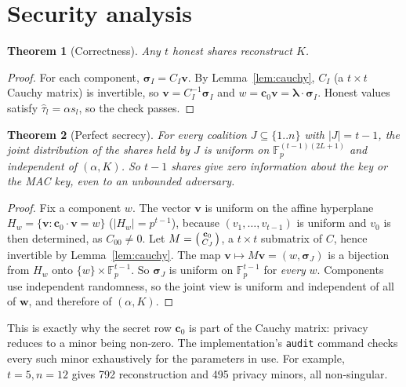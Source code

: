 \documentclass[11pt]{article}
\newtheorem{theorem}{Theorem}
\theoremstyle{remark}
\newcommand{\F}{\mathbb{F}_p}
\newcommand{\vect}[1]{\mathbf{#1}}
\begin{document}
\section{Security analysis}

\begin{theorem}[Correctness]
Any $t$ honest shares reconstruct $K$.
\end{theorem}
\begin{proof}
For each component, $\boldsymbol\sigma_I = C_I\vect v$. By Lemma~\ref{lem:cauchy},
$C_I$ (a $t\times t$ Cauchy matrix) is invertible, so
$\vect v = C_I^{-1}\boldsymbol\sigma_I$ and
$w=\vect c_0\vect v=\boldsymbol\lambda\cdot\boldsymbol\sigma_I$.
Honest values satisfy $\hat\tau_l=\alpha s_l$, so the check passes.
\end{proof}

\begin{theorem}[Perfect secrecy]\label{thm:privacy}
For every coalition $J\subseteq\{1..n\}$ with $|J|=t-1$, the joint distribution of
the shares held by $J$ is uniform on $\F^{(t-1)(2L+1)}$ and independent of
$(\alpha, K)$. So $t-1$ shares give \emph{zero} information about the key or the
MAC key, even to an unbounded adversary.
\end{theorem}
\begin{proof}
Fix a component $w$. The vector $\vect v$ is uniform on the affine hyperplane
$H_w = \{\vect v : \vect c_0\cdot\vect v = w\}$ ($|H_w| = p^{t-1}$), because
$(v_1,\dots,v_{t-1})$ is uniform and $v_0$ is then determined, as $C_{00}\neq 0$.
Let $M=\begin{psmallmatrix}\vect c_0\\ C_J\end{psmallmatrix}$, a $t\times t$
submatrix of $C$, hence invertible by Lemma~\ref{lem:cauchy}. The map
$\vect v\mapsto M\vect v = (w,\boldsymbol\sigma_J)$ is a bijection from $H_w$ onto
$\{w\}\times\F^{t-1}$. So $\boldsymbol\sigma_J$ is uniform on $\F^{t-1}$ for
\emph{every} $w$. Components use independent randomness, so the joint view is
uniform and independent of all of $\vect w$, and therefore of $(\alpha,K)$.
\end{proof}

\noindent This is exactly why the secret row $\vect c_0$ is part of the Cauchy matrix:
privacy reduces to a minor being non-zero. The implementation's
\texttt{audit} command checks every such minor exhaustively for the parameters
in use. For example, $t=5,n=12$ gives 792 reconstruction and 495 privacy minors,
all non-singular.
\end{document}
